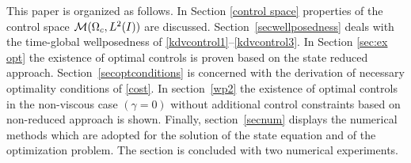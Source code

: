 {\color{red} This paper is organized as follows. In Section \ref{control space} properties of the control space $\mathcal{M}(\Omega_c, L^{2}(I))$ are discussed. Section~\ref{secwellposedness} deals with the time-global wellposedness of \eqref{kdvcontrol1}--\eqref{kdvcontrol3}. In Section \ref{sec:ex opt} the existence of optimal controls is proven based on the state reduced approach. Section~\ref{secoptconditions} is concerned with the derivation of necessary optimality conditions of \eqref{cost}. In section~\ref{wp2} the existence of optimal controls in the non-viscous case $(\gamma=0)$ without additional control constraints based on non-reduced approach is shown. Finally, section~\ref{secnum} displays the numerical methods which are adopted for the solution of the state equation and of the optimization problem. The section is concluded with two numerical experiments.}
